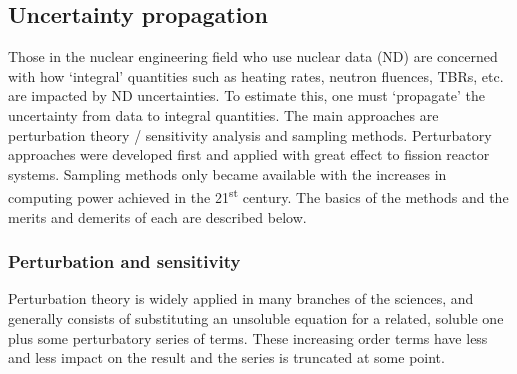 

\FloatBarrier
\subsection{Uncertainty propagation}
Those in the nuclear engineering field who use nuclear data (ND) are concerned with how `integral' quantities such as heating rates, neutron fluences, TBRs, etc. are impacted by ND uncertainties. To estimate this, one must `propagate' the uncertainty from data to integral quantities. The main approaches are perturbation theory / sensitivity analysis and sampling methods. Perturbatory approaches were developed first and applied with great effect to fission reactor systems. Sampling methods only became available with the increases in computing power achieved in the 21\textsuperscript{st} century. The basics of the methods and the merits and demerits of each are described below.

\FloatBarrier
\subsubsection{Perturbation and sensitivity}
\label{subsubsec:pert}
Perturbation theory is widely applied in many branches of the sciences, and generally consists of substituting an unsoluble equation for a related, soluble one plus some perturbatory series of terms. These increasing order terms have less and less impact on the result and the series is truncated at some point. 

